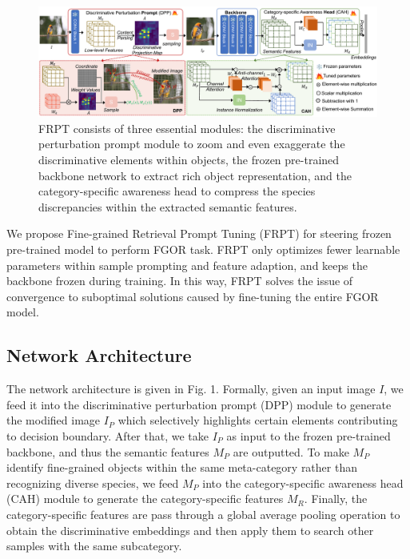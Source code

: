 \documentclass[letterpaper]{article} %
\begin{document}
\begin{figure}[t]
\begin{center}
\includegraphics[width=1\linewidth]{ap}
\end{center}
\caption{FRPT consists of three essential modules: the discriminative perturbation prompt module to zoom and even exaggerate the discriminative elements within objects, the frozen pre-trained backbone network to extract rich object representation, and the category-specific awareness head to compress the species discrepancies within the extracted semantic features.}

\end{figure}




We propose Fine-grained Retrieval Prompt Tuning (FRPT) for steering frozen pre-trained model to perform FGOR task. FRPT only optimizes fewer learnable parameters within sample prompting and feature adaption, and keeps the backbone frozen during training. In this way, FRPT solves the issue of convergence to suboptimal solutions caused by fine-tuning the entire FGOR model.



\subsection{Network Architecture}
The network architecture is given in Fig. 1.
Formally, given an input image $ I $, we feed it into the discriminative perturbation prompt (DPP) module to generate the modified image $ I_P $ which selectively highlights certain elements contributing to decision boundary. After that, we take $ I_P $ as input to the frozen pre-trained backbone, and thus the semantic features $ M_P $ are outputted.
To make $M_P$ identify fine-grained objects within the same meta-category rather than recognizing diverse species, we feed $ M_P $ into the category-specific awareness head (CAH) module to generate the category-specific features $ M_R $.  Finally, the category-specific features are pass through a global average pooling operation to obtain the discriminative embeddings and then apply them to search other samples with the same subcategory. %
\end{document}
